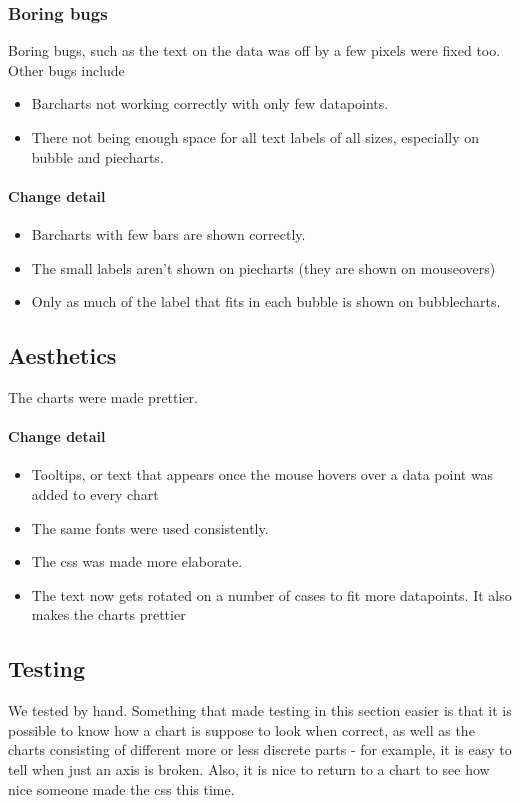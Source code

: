   \subsubsection{Boring bugs}
  Boring bugs, such as the text on the data was off by a few pixels were fixed too.
  Other bugs include 
  \begin{itemize}
  	\item Barcharts not working correctly with only few datapoints.
  	\item There not being enough space for all text labels of all sizes, especially on bubble and piecharts.
  \end{itemize}
  
  \paragraph{Change detail}
  \begin{itemize}
  	\item Barcharts with few bars are shown correctly. 
  	\item The small labels aren't shown on piecharts (they are shown on mouseovers)
  	\item Only as much of the label that fits in each bubble is shown on bubblecharts.
\end{itemize}
  


\subsection{Aesthetics}
The charts were made prettier.
  
\paragraph{Change detail}
\begin{itemize}
  \item Tooltips, or text that appears once the mouse hovers over a data point was added to every chart
  \item The same fonts were used consistently.
  \item The css was made more elaborate.
  \item The text now gets rotated on a number of cases to fit more datapoints. It also makes the charts prettier

\end{itemize}
  
\subsection{Testing}
 We tested by hand. Something that made testing in this section easier is that it is possible to know
 how a chart is suppose to look when correct, as well as the charts consisting of different more or less discrete
 parts - for example, it is easy to tell when just an axis is broken.
 Also, it is nice to return to a chart to see how nice someone made the css this time. 
 
